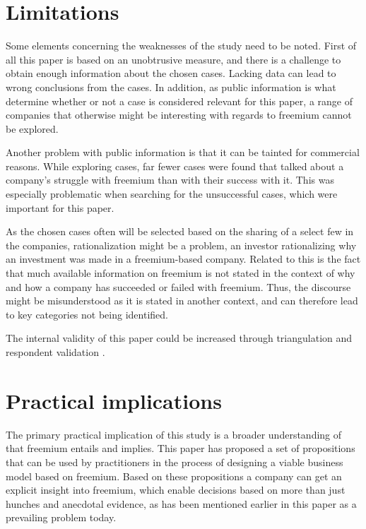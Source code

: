 \section{Limitations}

Some elements concerning the weaknesses of the study need to be noted. First of all this paper is based on an unobtrusive measure, and there is a challenge to obtain enough information about the chosen cases. Lacking data can lead to wrong conclusions from the cases. In addition, as public information is what determine whether or not a case is considered relevant for this paper, a range of companies that otherwise might be interesting with regards to freemium cannot be explored.

Another problem with public information is that it can be tainted for commercial reasons. While exploring cases, far fewer cases were found that talked about a company's struggle with freemium than with their success with it. This was especially problematic when searching for the unsuccessful cases, which were important for this paper.

As the chosen cases often will be selected based on the sharing of a select few in the companies, rationalization might be a problem, \eg an investor rationalizing why an investment was made in a freemium-based company. Related to this is the fact that much available information on freemium is not stated in the context of why and how a company has succeeded or failed with freemium. Thus, the discourse might be misunderstood as it is stated in another context, and can therefore lead to key categories not being identified.

The internal validity of this paper could be increased through triangulation and respondent validation \citep{webb2000}.

\section{Practical implications}

The primary practical implication of this study is a broader understanding of that freemium entails and implies. This paper has proposed a set of propositions that can be used by practitioners in the process of designing a viable business model based on freemium. Based on these propositions a company can get an explicit insight into freemium, which enable decisions based on more than just hunches and anecdotal evidence, as has been mentioned earlier in this paper as a prevailing problem today.

